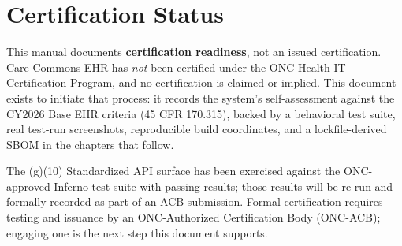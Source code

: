 \maketitle

\clearpage
\section*{Certification Status}

This manual documents \textbf{certification readiness}, not an issued
certification. Care Commons EHR has \emph{not} been certified under the ONC
Health IT Certification Program, and no certification is claimed or implied.
This document exists to initiate that process: it records the system's
self-assessment against the CY2026 Base EHR criteria (45 CFR 170.315),
backed by a behavioral test suite, real test-run screenshots, reproducible
build coordinates, and a lockfile-derived SBOM in the chapters that follow.

The (g)(10) Standardized API surface has been exercised against the
ONC-approved Inferno test suite with passing results; those results will be
re-run and formally recorded as part of an ACB submission. Formal
certification requires testing and issuance by an ONC-Authorized
Certification Body (ONC-ACB); engaging one is the next step this document
supports.

\tableofcontents
